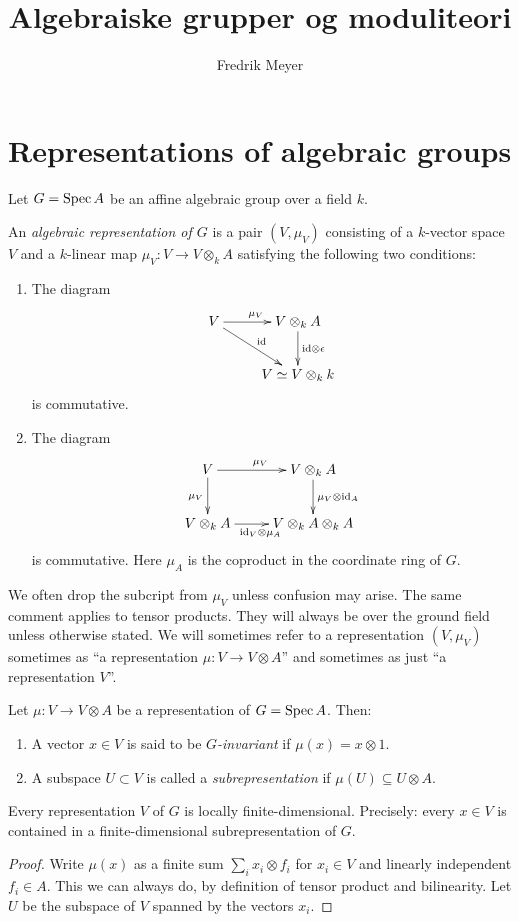 \documentclass[11pt, norsk]{article}
\begin{document}
\title{Algebraiske grupper og moduliteori}
\author{Fredrik Meyer}
\maketitle 

\section{Representations of algebraic groups}

Let $G = \operatorname{Spec} A$ be an affine algebraic group over a field $k$. 

\begin{defi}
 An \emph{algebraic representation of $G$} is a pair $(V,\mu_V)$ consisting of a $k$-vector space $V$ and a $k$-linear map $\mu_V: V \to V \otimes_k A$ satisfying the following two conditions:
 \begin{enumerate}
 \item The diagram
\[
\xymatrix{
V \ar[dr]^\id \ar[r]^{\mu_V} & V \otimes_k A \ar[d]^{\id \otimes \epsilon} \\
 & V \simeq V \otimes_k k
}
\]
is commutative.
\item The diagram
\[
\xymatrix{
V \ar[r]^{\mu_V} \ar[d]_{\mu_V} & V \otimes_k A \ar[d]^{\mu_V \otimes \id_A} \\
V \otimes_k A \ar[r]_{\id_V \otimes \mu_A} & V \otimes _k A \otimes_k A
}
\]
is commutative. Here $\mu_A$ is the coproduct in the coordinate ring of $G$.
 \end{enumerate}
\end{defi}

We often drop the subcript from $\mu_V$ unless confusion may arise. The same comment applies to tensor products. They will always be over the ground field unless otherwise stated. We will sometimes refer to a representation $(V,\mu_V)$ sometimes as ``a representation $\mu:V \to V \otimes A$'' and sometimes as just ``a representation $V$''.

\begin{defi}
Let $\mu:V \to V \otimes A$ be a representation of $G = \operatorname{Spec} A$. Then:
\begin{enumerate}
\item A vector $x \in V$ is said to be \emph{$G$-invariant} if $\mu(x) = x \otimes 1$.
\item A subspace $U \subset V$ is called a \emph{subrepresentation} if $\mu(U) \subseteq U \otimes A$. 
\end{enumerate}
\end{defi}

\begin{prop}
Every representation $V$ of $G$ is locally finite-dimensional. Precisely: every $x \in V$ is contained in a finite-dimensional subrepresentation of $G$.
\end{prop}

\begin{proof}
Write $\mu(x)$ as a finite sum $\sum_i x_i \otimes f_i$ for $x_i \in V$ and linearly independent $f_i \in A$. This we can always do, by definition of tensor product and bilinearity. Let $U$ be the subspace of $V$ spanned by the vectors $x_i$. 
\end{proof}
\end{document}
